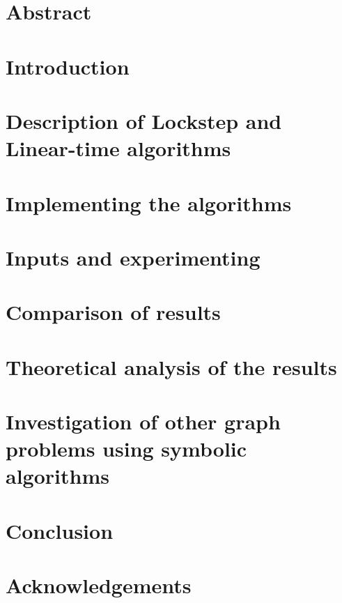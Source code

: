 \documentclass[a4, english]{article}
\title{\titlecontent}
\author{Magdalena Kalin-Czerska}
\author{Jonathan Eilath}
\author{Mikael Bisgaard Dahlsen-Jensen}
\affil{Aarhus University}
\newcommand{\sectionpath}{../sections/}
\begin{document}
 \pagestyle{empty}

\maketitle

\newpage

\section{Abstract}

\section{Introduction}

\section{Description of  Lockstep and Linear-time algorithms}

\section{Implementing the algorithms}

\section{Inputs and experimenting}

\section{Comparison of results}

\section{Theoretical analysis of the results}

\section{Investigation of other graph problems using symbolic algorithms}

\section{Conclusion}

\section{Acknowledgements}

\printbibliography
\appendix
\end{document}
